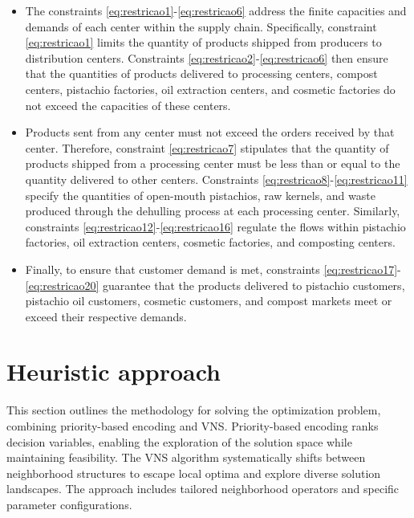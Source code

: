 \documentclass[sn-nature]{sn-jnl}%
\theoremstyle{thmstyleone}%
\theoremstyle{thmstyletwo}%
\theoremstyle{thmstylethree}%
\begin{document}
\begin{itemize}
    For example, $R_j = 1$ if facility $j$ is open, and 0 otherwise. The other variables in the model are continuous and positive, representing real numbers 
    greater than or equal to zero, used for modeling flows, quantities, and other measurable factors.
    \item The constraints \eqref{eq:restricao1}-\eqref{eq:restricao6} address the finite capacities and demands of each center within the supply chain. Specifically, constraint \eqref{eq:restricao1} limits the quantity of 
    products shipped from producers to distribution centers. Constraints \eqref{eq:restricao2}-\eqref{eq:restricao6} then ensure that the quantities of products delivered to processing centers, compost 
    centers, pistachio factories, oil extraction centers, and cosmetic factories do not exceed the capacities of these centers.
    \item Products sent from any center must not exceed the orders received by that center. Therefore, constraint \eqref{eq:restricao7} stipulates that the quantity of products 
    shipped from a processing center must be less than or equal to the quantity delivered to other centers. 
    Constraints \eqref{eq:restricao8}-\eqref{eq:restricao11} specify the quantities of open-mouth pistachios, raw kernels, and waste produced through the dehulling process at each processing center. 
    Similarly, constraints \eqref{eq:restricao12}-\eqref{eq:restricao16} regulate the flows within pistachio factories, oil extraction centers, cosmetic factories, and composting centers. 
    \item Finally, to ensure that customer demand is met, constraints \eqref{eq:restricao17}-\eqref{eq:restricao20} guarantee that the products delivered to pistachio customers, pistachio oil customers, 
    cosmetic customers, and compost markets meet or exceed their respective demands.
\end{itemize}
    
\section{Heuristic approach}
\label{sec:sec3}

This section outlines the methodology for solving the optimization problem, combining priority-based encoding \cite{gen2006genetic} and VNS. Priority-based encoding ranks decision variables, enabling the exploration of the solution space while maintaining feasibility. The VNS algorithm systematically shifts between neighborhood structures to escape local optima and explore diverse solution landscapes. The approach includes tailored neighborhood operators and specific parameter configurations.
\end{document}
